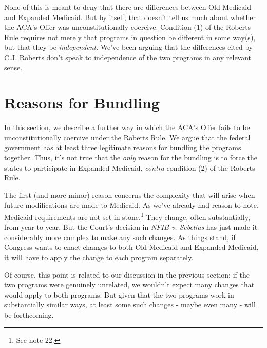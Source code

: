 None of this is meant to deny that there are differences between Old Medicaid and Expanded Medicaid. But by itself, that doesn't tell us much about whether the ACA's Offer was unconstitutionally coercive. Condition (1) of the Roberts Rule requires not merely that programs in question be different in some way(s), but that they be \emph{independent}. We've been arguing that the differences cited by C.J. Roberts don't speak to independence of the two programs in any relevant sense.

\section{Reasons for Bundling
}
In this section, we describe a further way in which the ACA's Offer fails to be unconstitutionally coercive under the Roberts Rule. We argue that the federal government has at least three legitimate reasons for bundling the programs together. Thus, it's not true that the \emph{only} reason for the bundling is to force the states to participate in Expanded Medicaid, \emph{contra }condition (2) of the Roberts Rule.

The first (and more minor) reason concerns the complexity that will arise when future modifications are made to Medicaid. As we've already had reason to note, Medicaid requirements are not set in stone.\footnote{See note 22.} They change, often substantially, from year to year. But the Court's decision in \emph{NFIB v. Sebelius} has just made it considerably more complex to make any such changes. As things stand, if Congress wants to enact changes to both Old Medicaid and Expanded Medicaid, it will have to apply the change to each program separately. 

Of course, this point is related to our discussion in the previous section; if the two programs were genuinely unrelated, we wouldn't expect many changes that would apply to both programs. But given that the two programs work in substantially similar ways, at least some such changes - maybe even many - will be forthcoming. 

